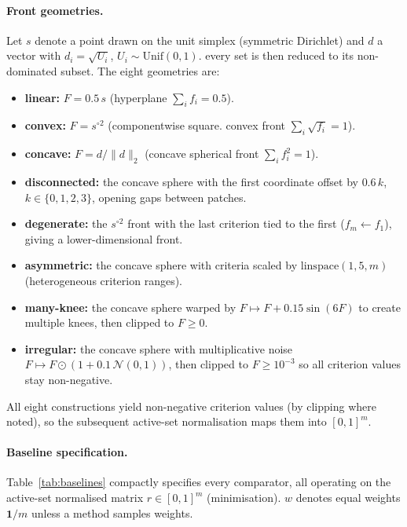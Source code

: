 \paragraph{Front geometries.}
Let $s$ denote a point drawn on the unit simplex (symmetric Dirichlet) and
$d$ a vector with $d_i=\sqrt{U_i}$, $U_i\sim\mathrm{Unif}(0,1)$. every set is then
reduced to its non-dominated subset. The eight geometries are:
\begin{itemize}
\item \textbf{linear:} $F=0.5\,s$ (hyperplane $\sum_i f_i=0.5$).
\item \textbf{convex:} $F=s^{\circ 2}$ (componentwise square. convex front
$\sum_i\sqrt{f_i}=1$).
\item \textbf{concave:} $F=d/\lVert d\rVert_2$ (concave spherical front
$\sum_i f_i^2=1$).
\item \textbf{disconnected:} the concave sphere with the first coordinate offset
by $0.6\,k$, $k\in\{0,1,2,3\}$, opening gaps between patches.
\item \textbf{degenerate:} the $s^{\circ 2}$ front with the last criterion
tied to the first ($f_m\!\leftarrow\! f_1$), giving a lower-dimensional front.
\item \textbf{asymmetric:} the concave sphere with criteria scaled by
$\mathrm{linspace}(1,5,m)$ (heterogeneous criterion ranges).
\item \textbf{many-knee:} the concave sphere warped by $F\!\mapsto\!F+0.15\sin(6F)$
to create multiple knees, then clipped to $F\ge 0$.
\item \textbf{irregular:} the concave sphere with multiplicative noise
$F\!\mapsto\!F\odot(1+0.1\,\mathcal N(0,1))$, then clipped to $F\ge 10^{-3}$ so all
criterion values stay non-negative.
\end{itemize}
All eight constructions yield non-negative criterion values (by clipping where
noted), so the subsequent active-set normalisation maps them into $[0,1]^m$.

\paragraph{Baseline specification.}
Table~\ref{tab:baselines} compactly specifies every comparator, all operating on
the active-set normalised matrix $r\in[0,1]^m$ (minimisation). $w$ denotes
equal weights $\mathbf 1/m$ unless a method samples weights.



\clearpage

